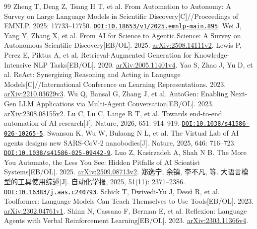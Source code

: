 \begingroup\fontsize{9.5}{11.5}\selectfont\raggedright{}
\begin{thebibliography}{99}
\setlength{\itemsep}{0pt}\setlength{\parsep}{0pt}
 Zheng T, Deng Z, Tsang H T, et al. From Automation to Autonomy: A Survey on Large Language Models in Scientific Discovery[C]//Proceedings of EMNLP. 2025: 17733--17750. \href{https://doi.org/10.18653/v1/2025.emnlp-main.895}{\nolinkurl{DOI:10.18653/v1/2025.emnlp-main.895}}.
 Wei J, Yang Y, Zhang X, et al. From AI for Science to Agentic Science: A Survey on Autonomous Scientific Discovery[EB/OL]. 2025. \href{https://arxiv.org/abs/2508.14111v2}{arXiv:2508.14111v2}.
 Lewis P, Perez E, Piktus A, et al. Retrieval-Augmented Generation for Knowledge-Intensive NLP Tasks[EB/OL]. 2020. \href{https://arxiv.org/abs/2005.11401v4}{arXiv:2005.11401v4}.
 Yao S, Zhao J, Yu D, et al. ReAct: Synergizing Reasoning and Acting in Language Models[C]//International Conference on Learning Representations. 2023. \href{https://arxiv.org/abs/2210.03629v3}{arXiv:2210.03629v3}.
 Wu Q, Bansal G, Zhang J, et al. AutoGen: Enabling Next-Gen LLM Applications via Multi-Agent Conversation[EB/OL]. 2023. \href{https://arxiv.org/abs/2308.08155v2}{arXiv:2308.08155v2}.
 Lu C, Lu C, Lange R T, et al. Towards end-to-end automation of AI research[J]. Nature, 2026, 651: 914--919. \href{https://doi.org/10.1038/s41586-026-10265-5}{\nolinkurl{DOI:10.1038/s41586-026-10265-5}}.
 Swanson K, Wu W, Bulaong N L, et al. The Virtual Lab of AI agents designs new SARS-CoV-2 nanobodies[J]. Nature, 2025, 646: 716--723. \href{https://doi.org/10.1038/s41586-025-09442-9}{\nolinkurl{DOI:10.1038/s41586-025-09442-9}}.
 Luo Z, Kasirzadeh A, Shah N B. The More You Automate, the Less You See: Hidden Pitfalls of AI Scientist Systems[EB/OL]. 2025. \href{https://arxiv.org/abs/2509.08713v2}{arXiv:2509.08713v2}.
 郑逸宁, 余镇, 李不凡, 等. 大语言模型的工具使用综述[J]. 自动化学报, 2025, 51(11): 2371--2386. \href{https://doi.org/10.16383/j.aas.c240793}{\nolinkurl{DOI:10.16383/j.aas.c240793}}.
 Schick T, Dwivedi-Yu J, Dessì R, et al. Toolformer: Language Models Can Teach Themselves to Use Tools[EB/OL]. 2023. \href{https://arxiv.org/abs/2302.04761v1}{arXiv:2302.04761v1}.
 Shinn N, Cassano F, Berman E, et al. Reflexion: Language Agents with Verbal Reinforcement Learning[EB/OL]. 2023. \href{https://arxiv.org/abs/2303.11366v4}{arXiv:2303.11366v4}.

\end{thebibliography}
